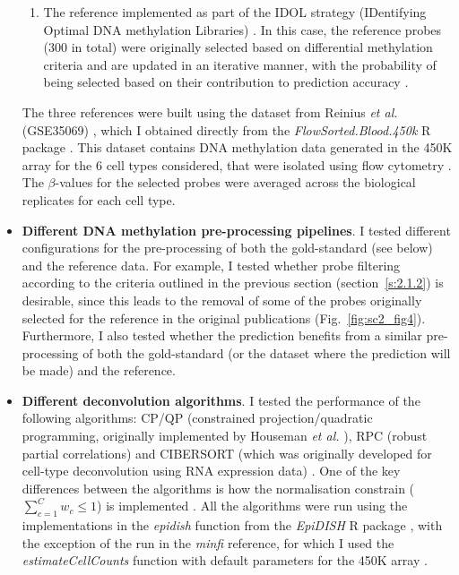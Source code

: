 \begin{itemize}
\begin{enumerate}
		\item The reference implemented as part of the \acrshort{IDOL} strategy (IDentifying Optimal DNA methylation Libraries) \cite{Koestler2016}. In this case, the reference probes (300 in total) were originally selected based on differential methylation criteria and are updated in an iterative manner, with the probability of being selected based on their contribution to prediction accuracy \cite{Koestler2016}.
	
	\end{enumerate}
	
	  The three references were built using the dataset from Reinius \textit{et al.} (GSE35069) \cite{Reinius2012}, which I obtained directly from the \textit{FlowSorted.Blood.450k} R package \cite{Jaffe2018}. This dataset contains DNA methylation data generated in the 450K array for the 6 cell types considered, that were isolated using flow cytometry \cite{Reinius2012}. The $\beta$-values for the selected probes were averaged across the biological replicates for each cell type. 
	
	\item \textbf{Different DNA methylation pre-processing pipelines}. I tested different configurations for the pre-processing of both the gold-standard (see below) and the reference data. For example, I tested whether probe filtering according to the criteria outlined in the previous section (section~\ref{s:2.1.2}) is desirable, since this leads to the removal of some of the probes originally selected for the reference in the original publications \cite{Teschendorff2017a,Koestler2016} (Fig.~\ref{fig:sc2_fig4}). Furthermore, I also tested whether the prediction benefits from a similar pre-processing of both the gold-standard (or the dataset where the prediction will be made) and the reference.
		
	\item \textbf{Different deconvolution algorithms}. I tested the performance of the following algorithms: CP/QP (constrained projection/quadratic programming, originally implemented by Houseman \textit{et al.} \cite{Houseman2012}), RPC (robust partial correlations) \cite{Teschendorff2017a} and CIBERSORT (which was originally developed for cell-type deconvolution using RNA expression data) \cite{Teschendorff2017a,Newman2015}. One of the key differences between the algorithms is how the normalisation constrain ($\sum_{c=1}^{C} w_c \leq 1$) is implemented \cite{Teschendorff2017a}. All the algorithms were run using the implementations in the \textit{epidish} function from the \textit{EpiDISH} R package \cite{Teschendorff2017b}, with the exception of the run in the \textit{minfi} reference, for which I used the \textit{estimateCellCounts} function with default parameters for the 450K array \cite{Aryee2014}. 

\end{itemize}

